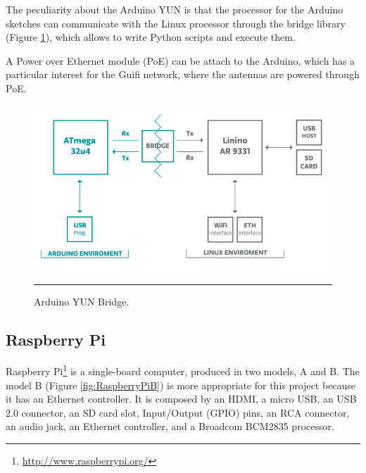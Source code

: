 \documentclass[12pt, a4paper,twoside]{tesi_upf}
\begin{document}
      The peculiarity about the Arduino YUN is that the processor for the Arduino sketches can communicate with the Linux processor through the bridge library (Figure \ref{fig:BridgeInShort}), which allows to write Python scripts and execute them.
      
      A Power over Ethernet module (PoE) can be attach to the Arduino, which has a particular interest for the Guifi network, where the antennas are powered through PoE.
      \begin{figure}[htbp]
          \centering
              \includegraphics[scale=0.5]{./Figures/BridgeInShort.png}
              \\
              \rule{23em}{0.5pt}
          \caption[Arduino YUN Bridge]{Arduino YUN Bridge.}
          \label{fig:BridgeInShort}
       \end{figure}
        
    \subsection{Raspberry Pi}
      Raspberry Pi\footnote{\url{http://www.raspberrypi.org/}} is a single-board computer, produced in two models, A and B. The model B (Figure \ref{fig:RaspberryPiB}) is more appropriate for this project because it has an Ethernet controller. It is composed by an HDMI, a micro USB, an USB 2.0 connector, an SD card slot, Input/Output (GPIO) pins, an RCA connector, an audio jack, an Ethernet controller, and a Broadcom BCM2835 processor.
     
\end{document}

